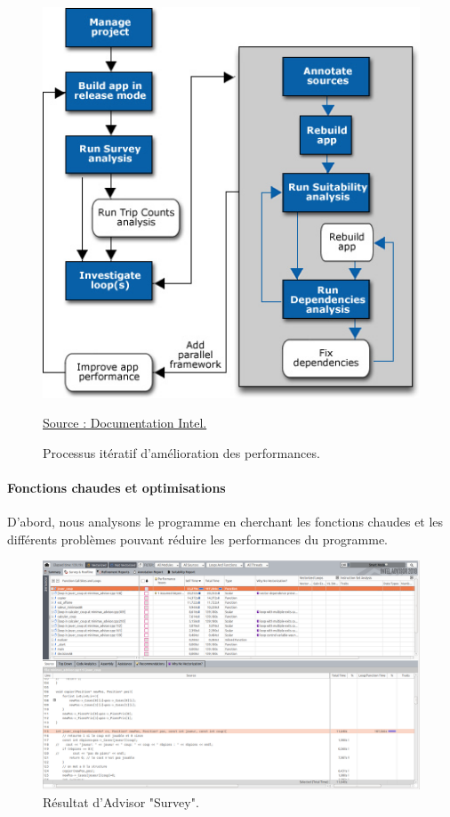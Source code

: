 \documentclass[
 aip,
 jmp,
 amsmath,amssymb,
 reprint
]{revtex4-1}
\begin{document}
\begin{figure}[H]
  \includegraphics[width=\linewidth, keepaspectratio=true]{Intel.jpg}
  \centering
  \caption{Processus itératif d'amélioration des performances.\label{Fig:intel_processes}}{\href{https://software.intel.com/en-us/node/684712}{Source : Documentation Intel.}}
\end{figure}

\paragraph{Fonctions chaudes et optimisations}
D'abord, nous analysons le programme en cherchant les fonctions chaudes et les différents problèmes pouvant réduire les performances du programme.

\begin{figure}[H]
  \includegraphics[width=\linewidth, keepaspectratio=true]{survey.png}
  \caption{Résultat d'Advisor "Survey".\label{Fig:advisor_survey}}
\end{figure}
\end{document}
